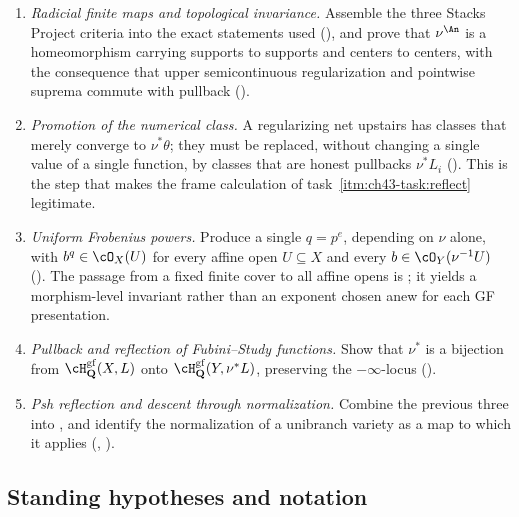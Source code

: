 \begin{enumerate}
\item\label{itm:ch43-task:radicial}
      \emph{Radicial finite maps and topological invariance.}  Assemble the
      three Stacks Project criteria into the exact statements used
      (), and prove that $\nu^{\An}$ is a
      homeomorphism carrying supports to supports and centers to centers,
      with the consequence that upper semicontinuous regularization and
      pointwise suprema commute with pullback
      ().
\item\label{itm:ch43-task:class}
      \emph{Promotion of the numerical class.}  A regularizing net upstairs
      has classes that merely converge to $\nu^*\theta$; they must be
      replaced, without changing a single value of a single function, by
      classes that are honest pullbacks $\nu^*L_i$
      ().  This is the step that makes the frame
      calculation of task~\cref{itm:ch43-task:reflect} legitimate.
\item\label{itm:ch43-task:frobenius}
      \emph{Uniform Frobenius powers.}  Produce a single $q=p^e$, depending
      on $\nu$ alone, with $b^q\in\cO_X(U)$ for every affine open
      $U\subseteq X$ and every $b\in\cO_Y(\nu^{-1}U)$
      ().  The passage from a fixed finite cover to
      all affine opens is ; it yields a
      morphism-level invariant rather than an exponent chosen anew for each
      GF presentation.
\item\label{itm:ch43-task:reflect}
      \emph{Pullback and reflection of Fubini--Study functions.}  Show that
      $\nu^*$ is a bijection from $\cH^{\mathrm{gf}}_{\mathbf Q}(X,L)$
      onto $\cH^{\mathrm{gf}}_{\mathbf Q}(Y,\nu^*L)$, preserving the
      $-\infty$-locus ().
\item\label{itm:ch43-task:psh}
      \emph{Psh reflection and descent through normalization.}  Combine the
      previous three into
      , and identify the
      normalization of a unibranch variety as a map to which it applies
      (, ).
\end{enumerate}

\subsection{Standing hypotheses and notation}
\label{sec:ch43-hypotheses}

